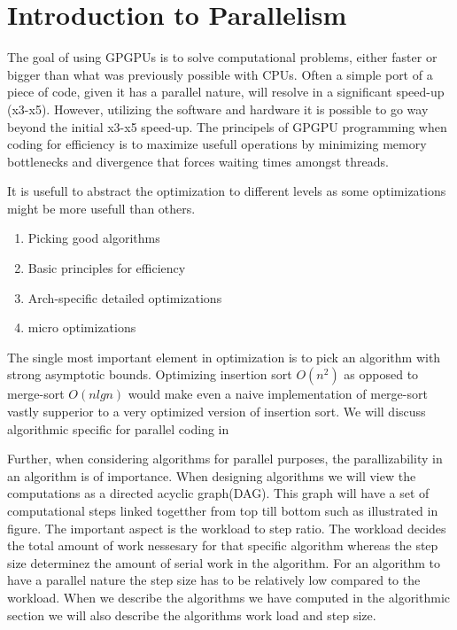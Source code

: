\section{Introduction to Parallelism}
\label{sec:introduction to parallelism}
The goal of using GPGPUs is to solve computational problems, either faster or bigger than what was previously possible with CPUs.
Often a simple port of a piece of code, given it has a parallel nature, will resolve in a significant speed-up (x3-x5).
However, utilizing the software and hardware it is possible to go way beyond the initial x3-x5 speed-up.
The principels of GPGPU programming when coding for efficiency is to maximize usefull operations by minimizing memory bottlenecks and divergence that forces waiting times amongst threads.

It is usefull to abstract the optimization to different levels as some optimizations might be more usefull than others.

\begin{enumerate}
\item Picking good algorithms
\item Basic principles for efficiency
\item Arch-specific detailed optimizations
\item micro optimizations
\end{enumerate}

The single most important element in optimization is to pick an algorithm with strong asymptotic bounds. Optimizing insertion sort $O(n^2)$ as opposed to merge-sort $O(nlgn)$ would make even a naive implementation of merge-sort vastly supperior to a very optimized version of insertion sort.
We will discuss algorithmic specific for parallel coding in  

Further, when considering algorithms for parallel purposes, the parallizability in an algorithm is of importance.
When designing algorithms we will view the computations as a directed acyclic graph(DAG).
This graph will have a set of computational steps linked togetther from top till bottom such as illustrated in figure. 
The important aspect is the workload to step ratio. The workload decides the total amount of work nessesary for that specific algorithm whereas the step size determinez the amount of serial work in the algorithm.
For an algorithm to have a parallel nature the step size has to be relatively low compared to the workload.
When we describe the algorithms we have computed in the algorithmic section we will also describe the algorithms work load and step size.

